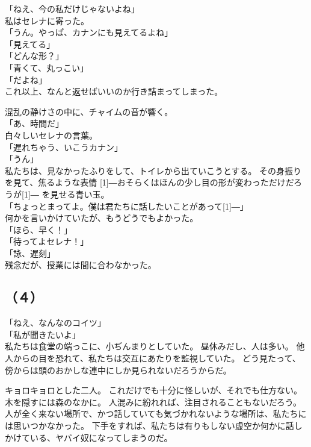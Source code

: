 \documentclass[../IHMain]{subfiles}
\begin{document}
「ねえ、今の私だけじゃないよね」\\
私はセレナに寄った。\\
「うん。やっぱ、カナンにも見えてるよね」\\
「見えてる」\\
「どんな形？」\\
「青くて、丸っこい」\\
「だよね」\\
これ以上、なんと返せばいいのか行き詰まってしまった。

混乱の静けさの中に、チャイムの音が響く。\\
「あ、時間だ」\\
白々しいセレナの言葉。\\
「遅れちゃう、いこうカナン」\\
「うん」\\
私たちは、見なかったふりをして、トイレから出ていこうとする。
その身振りを見て、焦るような表情
\scalebox{3}[1]{―}おそらくはほんの少し目の形が変わっただけだろうが\scalebox{3}[1]{―}
を見せる青い玉。\\
「ちょっとまってよ。僕は君たちに話したいことがあって\scalebox{3}[1]{―}」\\
何かを言いかけていたが、もうどうでもよかった。\\
「ほら、早く！」\\
「待ってよセレナ！」\\

「詠、遅刻」\\
残念だが、授業には間に合わなかった。

\subsection*{（４）}
「ねえ、なんなのコイツ」\\
「私が聞きたいよ」\\
私たちは食堂の端っこに、小ぢんまりとしていた。
昼休みだし、人は多い。
他人からの目を恐れて、私たちは交互にあたりを監視していた。
どう見たって、傍からは頭のおかしな連中にしか見られないだろうからだ。

キョロキョロとした二人。
これだけでも十分に怪しいが、それでも仕方ない。
木を隠すには森のなかに。
人混みに紛れれば、注目されることもないだろう。
人が全く来ない場所で、かつ話していても気づかれないような場所は、私たちには思いつかなかった。
下手をすれば、私たちは有りもしない虚空か何かに話しかけている、ヤバイ奴になってしまうのだ。
\end{document}
